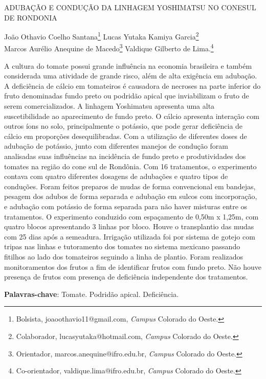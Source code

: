 \documentclass[article,12pt,onesidea,4paper,english,brazil]{abntex2}
\begin{document}
	
	
	\frenchspacing 
	
	\begin{center}
		\LARGE ADUBAÇÃO E CONDUÇÃO DA LINHAGEM YOSHIMATSU NO CONESUL DE RONDONIA
		
		\normalsize
		João Othavio Coelho Santana\footnote{Bolsista, joaoothavio11@gmail.com, \textit{Campus} Colorado do Oeste.} 
		Lucas Yutaka Kamiya Garcia\footnote{Colaborador, lucasyutaka@hotmail.com, \textit{Campus} Colorado do Oeste.} \\
		Marcos Aurélio Anequine de Macedo\footnote{Orientador, marcos.anequine@ifro.edu.br, \textit{Campus} Colorado do Oeste.} 
		Valdique Gilberto de Lima.\footnote{Co-orientador, valdique.lima@ifro.edu.br, \textit{Campus} Colorado do Oeste.} 
	\end{center}
	
	\noindent A cultura do tomate possui grande influência na economia brasileira e também
	considerada uma atividade de grande risco, além de alta exigência em adubação. A
	deficiência de cálcio em tomateiros é causadora de necroses na parte inferior do
	fruto denominadas fundo preto ou podridão apical que inviabilizam o fruto de serem
	comercializados. A linhagem Yoshimatsu apresenta uma alta suscetibilidade ao
	aparecimento de fundo preto. O cálcio apresenta interação com outros íons no solo,
	principalmente o potássio, que pode gerar deficiência de cálcio em proporções
	desequilibradas. Com a utilização de diferentes doses de adubação de potássio,
	junto com diferentes manejos de condução foram analisadas suas influências na
	incidência de fundo preto e produtividades dos tomates na região do cone sul de
	Rondônia. Com 16 tratamentos, o experimento contava com quatro diferentes
	dosagens de adubações e quatro tipos de conduções. Foram feitos preparos de
	mudas de forma convencional em bandejas, pesagem dos adubos de forma
	separada e adubação em sulcos com incorporação, e adubação com potássio de
	forma separada para não haver misturas entre os tratamentos. O experimento
	conduzido com espaçamento de 0,50m x 1,25m, com quatro blocos apresentando 3
	linhas por bloco. Houve o transplantio das mudas com 25 dias após a semeadura.
	Irrigação utilizada foi por sistema de gotejo com tripas nas linhas e tutoramento dos
	tomates no sistema mexicano passando fitilhos ao lado dos tomateiros seguindo a
	linha de plantio. Foram realizados monitoramentos dos frutos a fim de identificar
	frutos com fundo preto. Não houve presença de frutos com presença de deficiência
	independente dos tratamentos.
	
	\vspace{\onelineskip}
	
	\noindent
	\textbf{Palavras-chave}: Tomate. Podridão apical. Deficiência.
	
\end{document}
